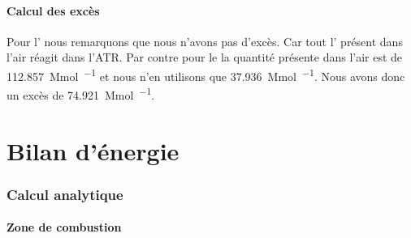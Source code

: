 \documentclass[french, a4paper, 10pt]{article}
\begin{document}
\subsection{Calcul des excès}
Pour l' nous remarquons que nous n'avons pas d'excès. Car tout l' présent dans l'air réagit dans l'ATR. 
Par contre pour le  la quantité présente dans l'air est de \SI{112.857}{\mega\mol\per\jour} et nous n'en utilisons que \SI{37.936}{\mega\mol\per\jour}.
Nous avons donc un excès de \SI{74.921}{\mega\mol\per\jour}.
\newpage
\part{Bilan d'énergie}
\section{Calcul analytique}
\subsection{Zone de combustion}
\end{document}
